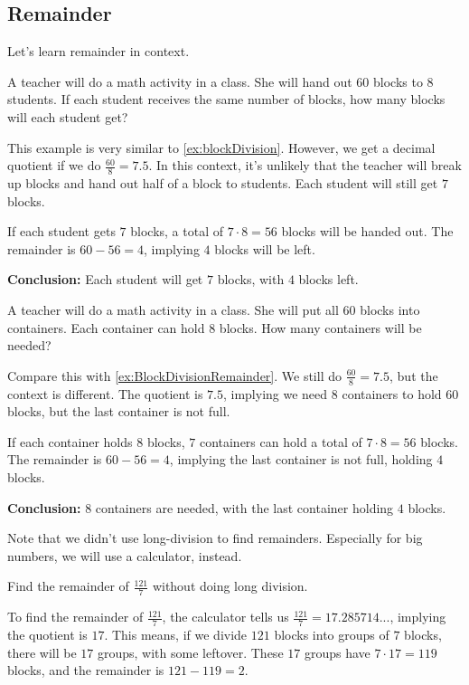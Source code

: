 \subsection{Remainder}
Let's learn remainder in context.
\begin{myexample}
	A teacher will do a math activity in a class. She will hand out $60$ blocks to $8$ students. If each student receives the same number of blocks, how many blocks will each student get?
\label{ex:BlockDivisionRemainder}
\end{myexample}
\begin{solution}
This example is very similar to \cref{ex:blockDivision}. However, we get a decimal quotient if we do $\frac{60}{8}=7.5$. In this context, it's unlikely that the teacher will break up blocks and hand out half of a block to students. Each student will still get $7$ blocks.

If each student gets $7$ blocks, a total of $7 \cdot 8=56$ blocks will be handed out. The remainder is $60-56=4$, implying $4$ blocks will be left.

\textbf{Conclusion:} Each student will get $7$ blocks, with $4$ blocks left.
\end{solution}

\begin{myexample}
	A teacher will do a math activity in a class. She will put all $60$ blocks into containers. Each container can hold $8$ blocks. How many containers will be needed?
\label{ex:MMDivisionRemainder}
\end{myexample}
\begin{solution}
Compare this with \cref{ex:BlockDivisionRemainder}. We still do $\frac{60}{8}=7.5$, but the context is different. The quotient is $7.5$, implying we need $8$ containers to hold $60$ blocks, but the last container is not full.

If each container holds $8$ blocks, $7$ containers can hold a total of $7 \cdot 8=56$ blocks. The remainder is $60-56=4$, implying the last container is not full, holding $4$ blocks.

\textbf{Conclusion:} $8$ containers are needed, with the last container holding $4$ blocks.
\end{solution}

Note that we didn't use long-division to find remainders. Especially for big numbers, we will use a calculator, instead.

\begin{myexample}
Find the remainder of $\frac{121}{7}$ without doing long division.
\label{ex:findRemainder}
\end{myexample}
\begin{solution}
To find the remainder of $\frac{121}{7}$, the calculator tells us $\frac{121}{7}=17.285714...$, implying the quotient is $17$. This means, if we divide $121$ blocks into groups of $7$ blocks, there will be $17$ groups, with some leftover. These $17$ groups have $7 \cdot 17 = 119$ blocks, and the remainder is $121-119=2$.
\end{solution}

